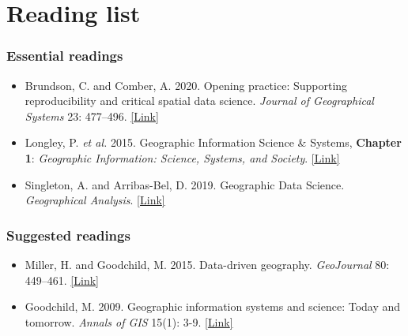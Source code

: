 \documentclass[
]{book}
\providecommand{\tightlist}{%
  \setlength{\itemsep}{0pt}\setlength{\parskip}{0pt}}
\begin{document}
\hypertarget{reading-w01}{%
\section{Reading list}\label{reading-w01}}

\hypertarget{essential-readings}{%
\subsubsection*{Essential readings}\label{essential-readings}}

\begin{itemize}
\tightlist
\item
  Brundson, C. and Comber, A. 2020. Opening practice: Supporting reproducibility and critical spatial data science. \emph{Journal of Geographical Systems} 23: 477--496. \href{https://doi.org/10.1007/s10109-020-00334-2}{{[}Link{]}}
\item
  Longley, P. \emph{et al.} 2015. Geographic Information Science \& Systems, \textbf{Chapter 1}: \emph{Geographic Information: Science, Systems, and Society}. \href{https://ucl.rl.talis.com/link?url=https\%3A\%2F\%2Fapp.knovel.com\%2Fhotlink\%2Ftoc\%2Fid\%3AkpGISSE001\%2Fgeographic-information-science\%3Fkpromoter\%3Dmarc\&sig=e437927b963cc591dcb65491eccdd3869cc31aef80e1443cb2ba12d8f3bb031a}{{[}Link{]}}
\item
  Singleton, A. and Arribas-Bel, D. 2019. Geographic Data Science. \emph{Geographical Analysis}. \href{https://doi.org/10.1111/gean.12194}{{[}Link{]}}
\end{itemize}

\hypertarget{suggested-readings}{%
\subsubsection*{Suggested readings}\label{suggested-readings}}

\begin{itemize}
\tightlist
\item
  Miller, H. and Goodchild, M. 2015. Data-driven geography. \emph{GeoJournal} 80: 449--461. \href{https://doi.org/10.1007/s10708-014-9602-6}{{[}Link{]}}
\item
  Goodchild, M. 2009. Geographic information systems and science: Today and tomorrow. \emph{Annals of GIS} 15(1): 3-9. \href{https://doi.org/10.1080/19475680903250715}{{[}Link{]}}
\end{itemize}
\end{document}
